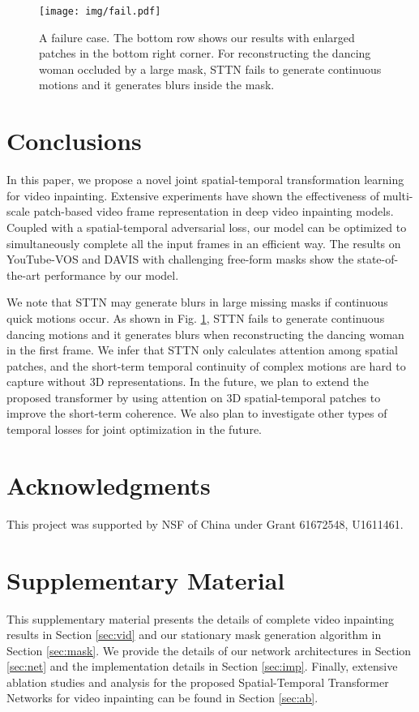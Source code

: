 \documentclass[runningheads]{llncs}
\begin{document}
\begin{figure}
   \begin{center}
      \texttt{[image: img/fail.pdf]}
   \end{center}
   \caption{A failure case. The bottom row shows our results with enlarged patches in the bottom right corner. For reconstructing the dancing woman occluded by a large mask, STTN fails to generate continuous motions and it generates blurs inside the mask.}
   \label{fig:failure}
\end{figure}

\section{Conclusions}
In this paper, we propose a novel joint spatial-temporal transformation learning for video inpainting. Extensive experiments have shown the effectiveness of multi-scale patch-based video frame representation in deep video inpainting models. Coupled with a spatial-temporal adversarial loss, our model can be optimized to simultaneously complete all the input frames in an efficient way. The results on YouTube-VOS \cite{xu2018youtube} and DAVIS \cite{caelles20182018} with challenging free-form masks show the state-of-the-art performance by our model.

We note that STTN may generate blurs in large missing masks if continuous quick motions occur. As shown in Fig. \ref{fig:failure}, STTN fails to generate continuous dancing motions and it generates blurs when reconstructing the dancing woman in the first frame. We infer that STTN only calculates attention among spatial patches, and the short-term temporal continuity of complex motions are hard to capture without 3D representations. 
In the future, we plan to extend the proposed transformer by using attention on 3D spatial-temporal patches to improve the short-term coherence. We also plan to investigate other types of temporal losses \cite{lai2018learning,wang2018video} for joint optimization in the future.


\section*{Acknowledgments}
This project was supported by NSF of China under Grant 61672548, U1611461.

\clearpage



\clearpage

\section*{Supplementary Material}
This supplementary material presents the details of complete video inpainting results in Section \ref{sec:vid} and our stationary mask generation algorithm in Section \ref{sec:mask}. 
We provide the details of our network architectures in Section \ref{sec:net} and the implementation details in Section \ref{sec:imp}. 
Finally, extensive ablation studies and analysis for the proposed Spatial-Temporal Transformer Networks for video inpainting can be found in Section \ref{sec:ab}.
\end{document}
